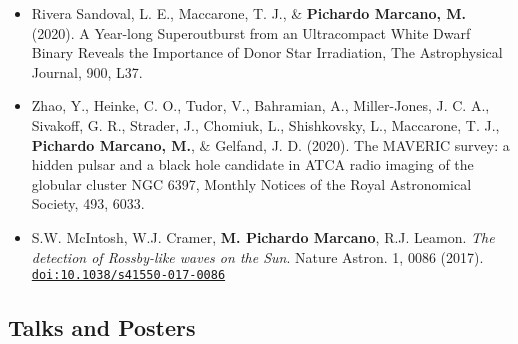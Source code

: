 \documentclass[letterpaper,10pt]{article}
\begin{document}
\begin{itemize}[label=$\blacktriangleright$]
        
        
    \item Rivera Sandoval, L. E., Maccarone, T. J., \& \textbf{Pichardo Marcano, M.} (2020). A Year-long Superoutburst from an Ultracompact White Dwarf Binary Reveals the Importance of Donor Star Irradiation, The Astrophysical Journal, 900, L37. \\

    \item Zhao, Y., Heinke, C. O., Tudor, V., Bahramian, A., Miller-Jones, J. C. A., Sivakoff, G. R., Strader, J., Chomiuk, L., Shishkovsky, L., Maccarone, T. J., \textbf{Pichardo Marcano, M.}, \& Gelfand, J. D. (2020). The MAVERIC survey: a hidden pulsar and a black hole candidate in ATCA radio imaging of the globular cluster NGC 6397, Monthly Notices of the Royal Astronomical Society, 493, 6033. \href{10.1093/mnras/staa631} \\


\item  S.W. McIntosh, W.J. Cramer, \textbf{M. Pichardo Marcano}, R.J. Leamon. \emph{The detection of Rossby-like waves on the Sun}. Nature Astron. 1, 0086 (2017). \href{http://dx.doi.org/10.1038/s41550-017-0086}{\tt doi:10.1038/s41550-017-0086} \\


\end{itemize}

\subsection*{Talks and Posters}
\end{document}
